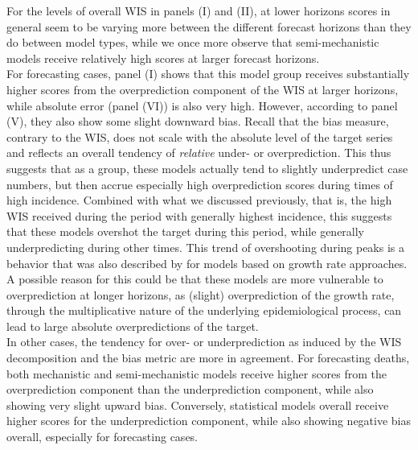 For the levels of overall WIS in panels (I) and (II), at lower horizons scores in general seem to be varying more between the different forecast horizons than they do between model types, while we once more observe that semi-mechanistic models receive relatively high scores at larger forecast horizons. \\
For forecasting cases, panel (I) shows that this model group receives substantially higher scores from the overprediction component of the WIS at larger horizons, while absolute error (panel (VI)) is also very high. However, according to panel (V), they also show some slight downward bias. Recall that the bias measure, contrary to the WIS, does not scale with the absolute level of the target series and reflects an overall tendency of \textit{relative} under- or overprediction. This thus suggests that as a group, these models actually tend to slightly underpredict case numbers, but then accrue especially high overprediction scores during times of high incidence. Combined with what we discussed previously, that is, the high WIS received during the period with generally highest incidence, this suggests that these models overshot the target during this period, while generally underpredicting during other times. This trend of overshooting during peaks is a behavior that was also described by \cite{bracher_evaluating_2021} for models based on growth rate approaches. A possible reason for this could be that these models are more vulnerable to overprediction at longer horizons, as (slight) overprediction of the growth rate, through the multiplicative nature of the underlying epidemiological process, can lead to large absolute overpredictions of the target.\\
In other cases, the tendency for over- or underprediction as induced by the WIS decomposition and the bias metric are more in agreement. For forecasting deaths, both mechanistic and semi-mechanistic models receive higher scores from the overprediction component than the underprediction component, while also showing very slight upward bias. Conversely, statistical models overall receive higher scores for the underprediction component, while also showing negative bias overall, especially for forecasting cases. \\
